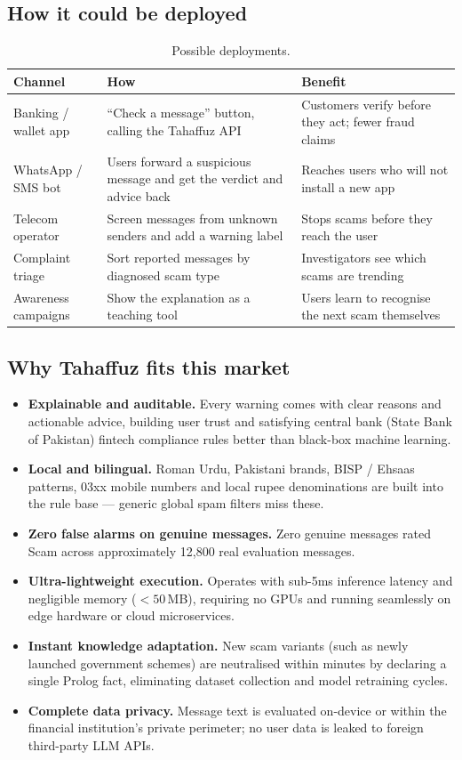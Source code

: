\documentclass[11pt,a4paper]{article}
\begin{document}
\subsection{How it could be deployed}
\begin{table}[H]
\centering
\small
\begin{tabularx}{\linewidth}{l X X}
\toprule
\textbf{Channel} & \textbf{How} & \textbf{Benefit} \\
\midrule
Banking / wallet app & ``Check a message'' button, calling the Tahaffuz API & Customers verify before they act; fewer fraud claims \\
WhatsApp / SMS bot   & Users forward a suspicious message and get the verdict and advice back & Reaches users who will not install a new app \\
Telecom operator     & Screen messages from unknown senders and add a warning label & Stops scams before they reach the user \\
Complaint triage     & Sort reported messages by diagnosed scam type & Investigators see which scams are trending \\
Awareness campaigns  & Show the explanation as a teaching tool & Users learn to recognise the next scam themselves \\
\bottomrule
\end{tabularx}
\caption{Possible deployments.}
\end{table}

\subsection{Why Tahaffuz fits this market}
\begin{itemize}
  \item \textbf{Explainable and auditable.} Every warning comes with clear reasons and actionable advice,
        building user trust and satisfying central bank (State Bank of Pakistan) fintech compliance rules
        better than black-box machine learning.
  \item \textbf{Local and bilingual.} Roman Urdu, Pakistani brands, BISP / Ehsaas patterns, 03xx mobile numbers
        and local rupee denominations are built into the rule base --- generic global spam filters miss these.
  \item \textbf{Zero false alarms on genuine messages.} Zero genuine messages rated Scam across approximately 12{,}800 real evaluation messages.
  \item \textbf{Ultra-lightweight execution.} Operates with sub-5ms inference latency and negligible memory ($<50$\,MB),
        requiring no GPUs and running seamlessly on edge hardware or cloud microservices.
  \item \textbf{Instant knowledge adaptation.} New scam variants (such as newly launched government schemes)
        are neutralised within minutes by declaring a single Prolog fact, eliminating dataset collection and model retraining cycles.
  \item \textbf{Complete data privacy.} Message text is evaluated on-device or within the financial institution's
        private perimeter; no user data is leaked to foreign third-party LLM APIs.
\end{itemize}
\end{document}
